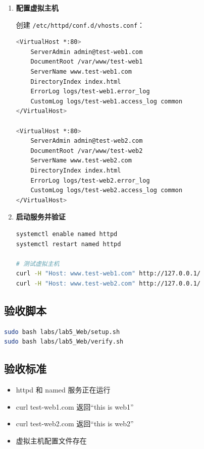 \documentclass[12pt,a4paper]{ctexart}
\begin{document}
\begin{enumerate}[label=\arabic*.,leftmargin=*]
  \item \textbf{配置虚拟主机}

  创建 \texttt{/etc/httpd/conf.d/vhosts.conf}：

  \begin{cmdbox}
  \small
  \begin{lstlisting}[language=bash]
<VirtualHost *:80>
    ServerAdmin admin@test-web1.com
    DocumentRoot /var/www/test-web1
    ServerName www.test-web1.com
    DirectoryIndex index.html
    ErrorLog logs/test-web1.error_log
    CustomLog logs/test-web1.access_log common
</VirtualHost>

<VirtualHost *:80>
    ServerAdmin admin@test-web2.com
    DocumentRoot /var/www/test-web2
    ServerName www.test-web2.com
    DirectoryIndex index.html
    ErrorLog logs/test-web2.error_log
    CustomLog logs/test-web2.access_log common
</VirtualHost>
  \end{lstlisting}
  \end{cmdbox}

  \item \textbf{启动服务并验证}

  \begin{cmdbox}
  \begin{lstlisting}[language=bash]
systemctl enable named httpd
systemctl restart named httpd

# 测试虚拟主机
curl -H "Host: www.test-web1.com" http://127.0.0.1/
curl -H "Host: www.test-web2.com" http://127.0.0.1/
  \end{lstlisting}
  \end{cmdbox}

\end{enumerate}

\subsection{验收脚本}

\begin{cmdbox}
\begin{lstlisting}[language=bash]
sudo bash labs/lab5_Web/setup.sh
sudo bash labs/lab5_Web/verify.sh
\end{lstlisting}
\end{cmdbox}

\subsection{验收标准}

\begin{itemize}
  \item httpd 和 named 服务正在运行
  \item curl test-web1.com 返回``this is web1''
  \item curl test-web2.com 返回``this is web2''
  \item 虚拟主机配置文件存在
\end{itemize}
\end{document}
